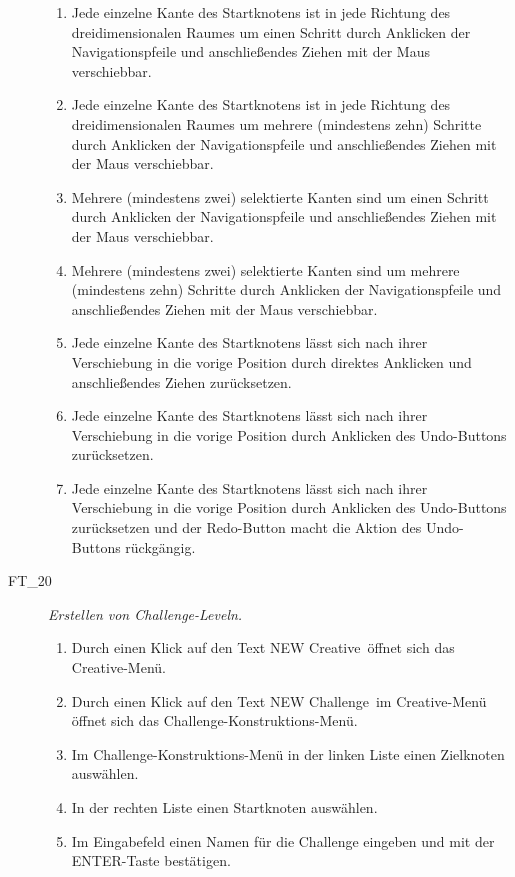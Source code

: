 \begin{description}
\begin{enumerate}
		\item Jede einzelne Kante des Startknotens ist in jede Richtung des dreidimensionalen Raumes um einen Schritt durch Anklicken der Navigationspfeile und anschließendes Ziehen mit der Maus verschiebbar.
		\item Jede einzelne Kante des Startknotens ist in jede Richtung des dreidimensionalen Raumes um mehrere (mindestens zehn) Schritte durch Anklicken der Navigationspfeile und anschließendes Ziehen mit der Maus verschiebbar.
		\item Mehrere (mindestens zwei) selektierte Kanten sind um einen Schritt durch Anklicken der Navigationspfeile und anschließendes Ziehen mit der Maus verschiebbar.
		\item Mehrere (mindestens zwei) selektierte Kanten sind um mehrere (mindestens zehn) Schritte durch Anklicken der Navigationspfeile und anschließendes Ziehen mit der Maus verschiebbar.
		
		\item Jede einzelne Kante des Startknotens lässt sich nach ihrer Verschiebung in die vorige Position durch direktes Anklicken und anschließendes Ziehen zurücksetzen.
		\item Jede einzelne Kante des Startknotens lässt sich nach ihrer Verschiebung in die vorige Position durch Anklicken des \glqq Undo\grqq-Buttons zurücksetzen.
		\item Jede einzelne Kante des Startknotens lässt sich nach ihrer Verschiebung in die vorige Position durch Anklicken des \glqq Undo\grqq-Buttons zurücksetzen und der \glqq Redo\grqq-Button macht die Aktion des \glqq Undo\grqq-Buttons rückgängig.
		~\\
	
	\end{enumerate}



\label{FT:20}

	\item[FT\_20] \textit{Erstellen von Challenge-Leveln.} \hfill\\
	
	\begin{enumerate}
	
		\item Durch einen Klick auf den Text \glqq NEW Creative\grqq~öffnet sich das Creative-Menü.
		\item Durch einen Klick auf den Text \glqq NEW Challenge\grqq~im Creative-Menü öffnet sich das Challenge-Konstruktions-Menü.
		\item Im Challenge-Konstruktions-Menü in der linken Liste einen Zielknoten auswählen.
		\item In der rechten Liste einen Startknoten auswählen.
		\item Im Eingabefeld einen Namen für die Challenge eingeben und mit der \glqq ENTER\grqq-Taste bestätigen.
		~\\
		

\end{enumerate}
\end{description}
